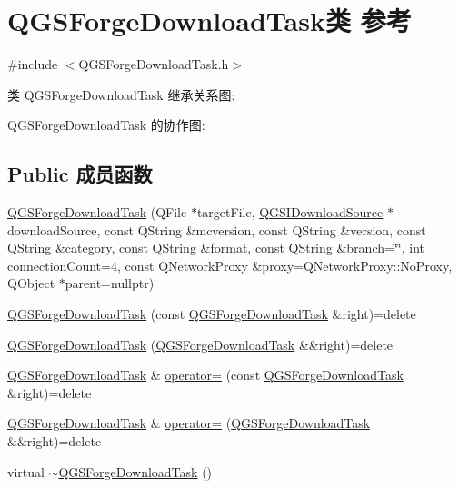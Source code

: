 \hypertarget{class_q_g_s_forge_download_task}{}\section{Q\+G\+S\+Forge\+Download\+Task类 参考}
\label{class_q_g_s_forge_download_task}


{\ttfamily \#include $<$Q\+G\+S\+Forge\+Download\+Task.\+h$>$}



类 Q\+G\+S\+Forge\+Download\+Task 继承关系图\+:


Q\+G\+S\+Forge\+Download\+Task 的协作图\+:
\subsection*{Public 成员函数}
\begin{DoxyCompactItemize}
\item 
\mbox{\hyperlink{class_q_g_s_forge_download_task_a421545f8dc598d2f1c4832936872a85b}{Q\+G\+S\+Forge\+Download\+Task}} (Q\+File $\ast$target\+File, \mbox{\hyperlink{class_q_g_s_i_download_source}{Q\+G\+S\+I\+Download\+Source}} $\ast$download\+Source, const Q\+String \&mcversion, const Q\+String \&version, const Q\+String \&category, const Q\+String \&format, const Q\+String \&branch=\char`\"{}\char`\"{}, int connection\+Count=4, const Q\+Network\+Proxy \&proxy=Q\+Network\+Proxy\+::\+No\+Proxy, Q\+Object $\ast$parent=nullptr)
\item 
\mbox{\hyperlink{class_q_g_s_forge_download_task_a3f707e4bae34a300aeb27508d8e251d3}{Q\+G\+S\+Forge\+Download\+Task}} (const \mbox{\hyperlink{class_q_g_s_forge_download_task}{Q\+G\+S\+Forge\+Download\+Task}} \&right)=delete
\item 
\mbox{\hyperlink{class_q_g_s_forge_download_task_af5d2cc985a3afdfd8234f471b69990af}{Q\+G\+S\+Forge\+Download\+Task}} (\mbox{\hyperlink{class_q_g_s_forge_download_task}{Q\+G\+S\+Forge\+Download\+Task}} \&\&right)=delete
\item 
\mbox{\hyperlink{class_q_g_s_forge_download_task}{Q\+G\+S\+Forge\+Download\+Task}} \& \mbox{\hyperlink{class_q_g_s_forge_download_task_add8b0d65a43ebf5c173994f6550858f0}{operator=}} (const \mbox{\hyperlink{class_q_g_s_forge_download_task}{Q\+G\+S\+Forge\+Download\+Task}} \&right)=delete
\item 
\mbox{\hyperlink{class_q_g_s_forge_download_task}{Q\+G\+S\+Forge\+Download\+Task}} \& \mbox{\hyperlink{class_q_g_s_forge_download_task_a66efc25f33ecc89dd074a15b1b1ebab4}{operator=}} (\mbox{\hyperlink{class_q_g_s_forge_download_task}{Q\+G\+S\+Forge\+Download\+Task}} \&\&right)=delete
\item 
virtual \mbox{\hyperlink{class_q_g_s_forge_download_task_a77f61dd39e27d68f6ba35865685cc058}{$\sim$\+Q\+G\+S\+Forge\+Download\+Task}} ()
\end{DoxyCompactItemize}
